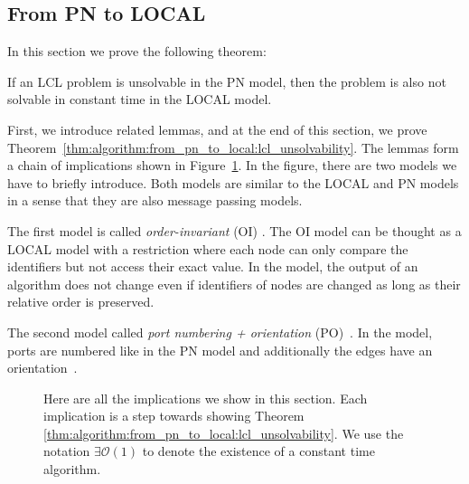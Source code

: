 \newpage
\subsection{From PN to LOCAL} \label{sec:algorithm:from_pn_to_local}

In this section we prove the following theorem:
\begin{theorem} \label{thm:algorithm:from_pn_to_local:lcl_unsolvability}
    If an LCL problem is unsolvable in the PN model, then the problem is also not solvable in constant time in the LOCAL model.
\end{theorem}

First, we introduce related lemmas, and at the end of this section, we prove Theorem~\ref{thm:algorithm:from_pn_to_local:lcl_unsolvability}.
The lemmas form a chain of implications shown in Figure~\ref{fig:proof_order:lcl_unsolvability}.
In the figure, there are two models we have to briefly introduce.
Both models are similar to the LOCAL and PN models in a sense that they are also message passing models.

The first model is called \emph{order-invariant} (OI) \cite{DBLP:journals/siamcomp/NaorS95}.
The OI model can be thought as a LOCAL model with a restriction where each node can only compare the identifiers but not access their exact value.
In the model, the output of an algorithm does not change even if identifiers of nodes are changed as long as their relative order is preserved.

The second model called \emph{port numbering + orientation} (PO)~\cite{DBLP:conf/istcs/MayerNS95}.
In the model, ports are numbered like in the PN model and additionally the edges have an orientation~\cite{DBLP:journals/dc/GoosHS17}.

\begin{figure}[H]
   \centering
    \caption{Here are all the implications we show in this section.
    Each implication is a step towards showing Theorem \ref{thm:algorithm:from_pn_to_local:lcl_unsolvability}.
    We use the notation $\exists\mathcal{O}(1)$ to denote the existence of a constant time algorithm.
    }
   \label{fig:proof_order:lcl_unsolvability}
\end{figure}

